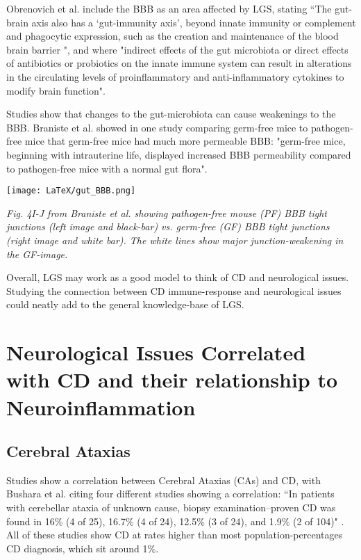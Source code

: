 \documentclass{article}
\begin{document}
Obrenovich et al. include the BBB as an area affected by LGS, stating ``The gut-brain axis also has a ‘gut-immunity axis’, beyond innate immunity or complement and phagocytic expression, such as the creation and maintenance of the blood brain barrier \cite{Braniste}"\cite{Obrenovich2}, and where "indirect effects of the gut microbiota or direct effects of antibiotics or probiotics on the innate immune system can result in alterations in the circulating levels of proinflammatory and anti-inflammatory cytokines to modify brain function"\cite{Obrenovich2}. 

Studies show that changes to the gut-microbiota can cause weakenings to the BBB. Braniste et al. showed in one study comparing germ-free mice to pathogen-free mice that germ-free mice had much more permeable BBB: "germ-free mice, beginning with intrauterine life, displayed increased BBB permeability compared to pathogen-free mice with a normal gut flora"\cite{Braniste2}.

\texttt{[image: LaTeX/gut\_BBB.png]}

\textit{Fig. 4I-J from Braniste et al. showing pathogen-free mouse (PF) BBB tight junctions (left image and black-bar) vs. germ-free (GF) BBB tight junctions (right image and white bar). The white lines show major junction-weakening in the GF-image.}

Overall, LGS may work as a good model to think of CD and neurological issues. Studying the connection between CD immune-response and neurological issues could neatly add to the general knowledge-base of LGS.

\section{Neurological Issues Correlated with CD and their relationship to Neuroinflammation}

\subsection{Cerebral Ataxias}

Studies show a correlation between Cerebral Ataxias (CAs) and CD, with Bushara et al. citing four different studies showing a correlation: ``In patients with cerebellar ataxia of unknown cause, biopsy examination–proven CD was found in 16$\%$ (4 of 25)\cite{Hadjivassiliou}, 16.7$\%$ (4 of 24)\cite{Luostarinen}, 12.5$\%$ (3 of 24)\cite{Pellecchia}, and 1.9$\%$ (2 of 104)\cite{Burk}" \cite{Bushara}. All of these studies show CD at rates higher than most population-percentages CD diagnosis, which sit around 1$\%$\cite{Lebwohl}. 
\end{document}
